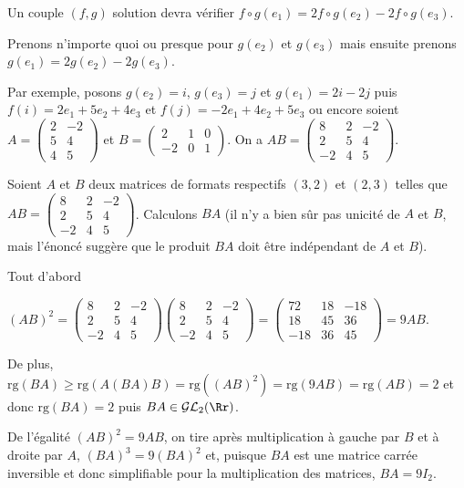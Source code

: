 {{Un couple $(f,g)$ solution devra vérifier $f\circ g(e_1)=2f\circ g(e_2)-2f\circ g(e_3)$.

Prenons n'importe quoi ou presque pour $g(e_2)$ et $g(e_3)$ mais ensuite prenons $g(e_1)= 2g(e_2) - 2g(e_3)$.

Par exemple, posons $g(e_2) = i$, $g(e_3) =j$ et $g(e_1) = 2i-2j$ puis $f(i) = 2e_1+5e_2+4e_3$ et $f(j)=-2e_1+4e_2+5e_3$ ou encore soient $A=\left(
\begin{array}{cc}
2&-2\\
5&4\\
4&5
\end{array}
\right)$ et $B=\left(
\begin{array}{ccc}
2&1&0\\
-2&0&1
\end{array}
\right)$. On a $AB=\left(
\begin{array}{ccc}
8&2&-2\\
2&5&4\\
-2&4&5
\end{array}
\right)$.

Soient $A$ et $B$ deux matrices de formats respectifs $(3,2)$ et $(2,3)$ telles que $AB=\left(
\begin{array}{ccc}
8&2&-2\\
2&5&4\\
-2&4&5
\end{array}
\right)$. Calculons $BA$ (il n'y a bien sûr pas unicité de $A$ et $B$, mais l'énoncé suggère que le produit $BA$ doit être indépendant de $A$ et $B$).

Tout d'abord 

\begin{center}
$(AB)^2=\left(
\begin{array}{ccc}
8&2&-2\\
2&5&4\\
-2&4&5
\end{array}
\right)\left(
\begin{array}{ccc}
8&2&-2\\
2&5&4\\
-2&4&5
\end{array}
\right)=\left(
\begin{array}{ccc}
72&18&-18\\
18&45&36\\
-18&36&45
\end{array}
\right)=9AB$.
\end{center}

De plus, $\text{rg}(BA)\geqslant\text{rg}(A(BA)B)=\text{rg}((AB)^2)=\text{rg}(9AB) =\text{rg}(AB)=2$ et donc $\text{rg}(BA)=2$ puis $BA\in\mathcal{GL}_2(\Rr)$.

De l'égalité $(AB)^2=9AB$, on tire après multiplication à gauche par $B$ et à droite par $A$, $(BA)^3=9(BA)^2$ et, puisque $BA$ est une matrice carrée inversible et donc simplifiable pour la multiplication des matrices, $BA=9I_2$.

\begin{center}
\end{center}
}
}
